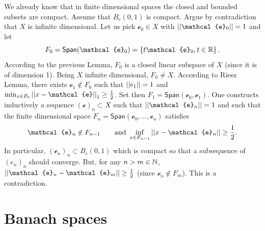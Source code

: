 \documentclass{article}
\begin{document}
\begin{fancyproof}
	We already know that in finite dimensional spaces the closed and bounded subsets are compact. Assume that $B_{c}(0,1)$ is compact. Argue by contradiction that $X$ is infinite dimensional. Let us pick $\mathcal{e}_{0}\in X$ with $\norm{\mathcal{e}_{0}}=1$ and let $$F_0=\mathsf{Span}(\mathcal{e}_{0})=\left\{t\mathcal{e}_{0},t\in\R\right\}.$$
	According to the previous Lemma, $F_{0}$ is a closed linear subspace of $X$ (since it is of dimension 1). Being $X$ infinite dimensional, $F_{0}\neq X$. According to Riesz Lemma, there exists $\mathcal{e}_{1}\notin F_{0}$ such that $\left|\left|e_{1}\right|\right|=1$ and $\min_{x\in F_{0}}\norm{x-\mathcal{e}}_{1}\geq\unmezz$. Set then $F_{1}=\mathsf{Span}(\mathcal{e}_{0},\mathcal{e}_{1})$. One constructs inductively a sequence ${(\mathcal{e})}_{n}\subset X$ such that $\norm{\mathcal{e}_{n}}=1$ and such that the finite dimensional space $F_{n}=\mathsf{Span}(\mathcal{e}_{0},\ldots,\mathcal{e}_{n})$ satisfies
	\begin{equation*}
		\mathcal{e}_{n}\notin F_{n-1}\qquad\text{and }\inf_{x\in F_{n-1}}\norm{x-\mathcal{e}_{n}}\geq\unmezz.
	\end{equation*}
	In particular, ${(\mathcal{e}_{n})}_{n}\subset B_{c}(0,1)$ which is compact so that a subsequence of ${(e_{n})}_{n}$ should converge. But, for any $n>m\in\mathbb{N}$, $\norm{\mathcal{e}_{n}-\mathcal{e}_{m}}\geq\unmezz$ (since $\mathcal{e}_{n}\notin F_{m}$). This is a contradiction.
\end{fancyproof}
\section{Banach spaces}
\end{document}
